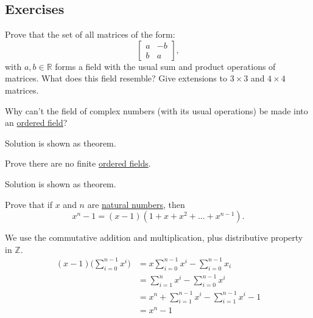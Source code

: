 \subsection{Exercises}

  \begin{exercise}
    Prove that the set of all matrices of the form:
    \begin{equation}
      \begin{bmatrix}
        a & -b \\
        b & a
      \end{bmatrix},
    \end{equation}
    with $a,b \in \mathbb{R}$ forms a field with the usual sum and product operations of
    matrices. What does this field resemble? Give extensions to $3 \times 3$ and
    $4 \times 4$ matrices.
  \end{exercise}
  \begin{solution}
    
  \end{solution}

  \begin{exercise}
    Why can't the field of complex numbers (with its usual operations) be
    made into an \hyperref[alg-def:ordered-field]{ordered field}?
  \end{exercise}
  \begin{solution}
    Solution is shown as theorem. 
  \end{solution}

  \begin{exercise}
    Prove there are no finite \hyperref[alg-def:ordered-field]{ordered fields}.
  \end{exercise}
  \begin{solution}
    Solution is shown as theorem. 
  \end{solution}

  \begin{exercise}
    Prove that if $x$ and $n$ are \hyperref[st-def:naturals]{natural numbers}, then
    \begin{equation}
      x^n - 1 = (x-1)(1 + x + x^2 + ... + x^{n-1}).
    \end{equation}
  \end{exercise}
  \begin{solution}
    We use the commutative addition and multiplication, plus distributive property in $\mathbb{Z}$. 
    \begin{align}
      (x - 1) \bigg( \sum_{i=0}^{n-1} x^i \bigg) & = x \sum_{i=0}^{n-1} x^i - \sum_{i=0}^{n-1} x_i \\
                                                 & = \sum_{i=1}^n x^i - \sum_{i=0}^{n-1} x^i \\
                                                 & = x^n + \sum_{i=1}^{n-1} x^i - \sum_{i=1}^{n-1} x^i - 1 \\
                                                 & = x^n - 1
    \end{align}
  \end{solution}

